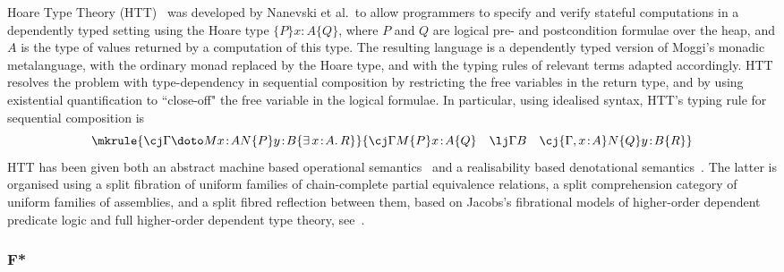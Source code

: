 Hoare Type Theory (HTT)~\cite{Nanevski:HTT} was developed by Nanevski et al.~to allow programmers to specify and verify stateful computations in a dependently typed setting using the Hoare type $\{P\} x \!:\! A \{Q\}$, where $P$ and $Q$ are logical pre- and postcondition formulae over the heap, and $A$ is the type of values returned by a computation of this type. 
The resulting language is a dependently typed version of Moggi's monadic metalanguage, with the ordinary monad replaced by the Hoare type, and with the typing rules of relevant terms adapted accordingly.
%
HTT resolves the problem with type-dependency in sequential composition by restricting the free variables in the return type, and by using existential quantification to ``close-off" the free variable in the logical formulae. In particular, using idealised syntax, HTT's typing rule for sequential composition is
\vspace{0.15cm}
\[
\mkrule
{\cj \Gamma {\doto M {x \!:\! A} {} N} {\{P\} y \!:\! B \{\exists\, x \!:\! A .\, R\}}}
{
\cj \Gamma M \{P\} x \!:\! A \{Q\}
\quad
\lj \Gamma B
\quad
\cj {\Gamma, x \!:\! A} N \{Q\} y \!:\! B \{R\}
}
\vspace{-0.1cm}
\]
HTT has been given both an abstract machine based operational semantics~\cite{Nanevski:HTT} and a realisability based denotational semantics~\cite{Petersen:HTT}. The latter is organised using a split fibration of uniform families of chain-complete partial equivalence relations, a split comprehension category of uniform families of assemblies, and a split fibred reflection between them, based on Jacobs's fibrational models of higher-order dependent predicate logic and full higher-order dependent type theory, see~\cite[Sections~11.2 and~11.6]{Jacobs:Book}.

\subsubsection*{F*}

